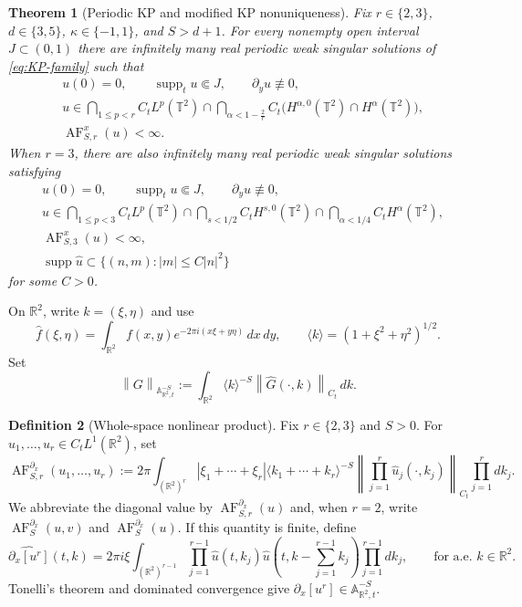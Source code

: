\documentclass[12pt,reqno,letterpaper]{amsart}
\numberwithin{equation}{section}
\newtheorem{theorem}{Theorem}[section]
\theoremstyle{definition}
\newtheorem{definition}[theorem]{Definition}
\newcommand{\T}{\mathbb T}
\newcommand{\R}{\mathbb R}
\newcommand{\A}{\mathbb A}
\newcommand{\supp}{\operatorname{supp}}
\newcommand{\norm}[1]{\left\lVert #1\right\rVert}
\newcommand{\abs}[1]{\left\lvert #1\right\rvert}
\begin{document}
\begin{theorem}[Periodic KP and modified KP nonuniqueness]
\label{thm:periodic}
Fix $r\in\{2,3\}$, $d\in\{3,5\}$, $\kappa\in\{-1,1\}$, and
$S>d+1$.  For every nonempty open interval $J\subset(0,1)$ there are
infinitely many real periodic weak singular solutions of
\eqref{eq:KP-family} such that
\begin{equation}\label{eq:periodic-regularity}
 \begin{aligned}
 &u(0)=0,\qquad \supp_tu\Subset J,\qquad \partial_yu\not\equiv0,\\
 &u\in\bigcap_{1\leq p<r}C_tL^p(\T^2)
 \cap\bigcap_{\alpha<1-\frac2r}
 C_t\bigl(H^{\alpha,0}(\T^2)\cap H^\alpha(\T^2)\bigr),\\
 &\operatorname{AF}_{S,r}^x(u)<\infty.
 \end{aligned}
\end{equation}
When $r=3$, there are also infinitely many real periodic weak singular
solutions satisfying
\begin{equation}\label{eq:periodic-parabolic-regularity}
 \begin{aligned}
 &u(0)=0,\qquad \supp_tu\Subset J,\qquad \partial_yu\not\equiv0,\\
 &u\in\bigcap_{1\leq p<3}C_tL^p(\T^2)
 \cap\bigcap_{s<1/2}C_tH^{s,0}(\T^2)
 \cap\bigcap_{\alpha<1/4}C_tH^\alpha(\T^2),\\
 &\operatorname{AF}_{S,3}^x(u)<\infty,\\
 &\supp\widehat u\subset\{(n,m):\abs m\leq C\abs n^2\}
 \end{aligned}
\end{equation}
for some $C>0$.
\end{theorem}

On $\R^2$, write $k=(\xi,\eta)$ and use
\[
 \widehat f(\xi,\eta)
 =\int_{\R^2}f(x,y)e^{-2\pi i(x\xi+y\eta)}\,dx\,dy,
 \qquad \langle k\rangle=(1+\xi^2+\eta^2)^{1/2}.
\]
Set
\[
 \norm{G}_{\A^{-S}_{\R^2,t}}
 :=\int_{\R^2}\langle k\rangle^{-S}
 \norm{\widehat G(\cdot,k)}_{C_t}\,dk.
\]

\begin{definition}[Whole-space nonlinear product]
\label{def:Euclidean-product}
Fix $r\in\{2,3\}$ and $S>0$.  For
$u_1,\ldots,u_r\in C_tL^1(\R^2)$, set
\begin{equation}\label{eq:Euclidean-Q}
 \operatorname{AF}^{\partial_x}_{S,r}(u_1,\ldots,u_r)
 :=2\pi\int_{(\R^2)^r}\abs{\xi_1+\cdots+\xi_r}
 \langle k_1+\cdots+k_r\rangle^{-S}
 \norm{\prod_{j=1}^r\widehat u_j(\cdot,k_j)}_{C_t}
 \prod_{j=1}^r dk_j.
\end{equation}
We abbreviate the diagonal value by
$\operatorname{AF}^{\partial_x}_{S,r}(u)$ and, when $r=2$, write
$\operatorname{AF}^{\partial_x}_S(u,v)$ and
$\operatorname{AF}^{\partial_x}_S(u)$.
If this quantity is finite, define
\begin{equation}\label{eq:Euclidean-nonlinearity}
 \widehat{\partial_x[u^r]}(t,k)
 =2\pi i\xi\int_{(\R^2)^{r-1}}
 \prod_{j=1}^{r-1}\widehat u(t,k_j)
 \widehat u\left(t,k-\sum_{j=1}^{r-1}k_j\right)
 \prod_{j=1}^{r-1}dk_j,
 \qquad\text{for a.e. }k\in\R^2.
\end{equation}
Tonelli's theorem and dominated convergence give
$\partial_x[u^r]\in\A^{-S}_{\R^2,t}$.
\end{definition}
\end{document}

